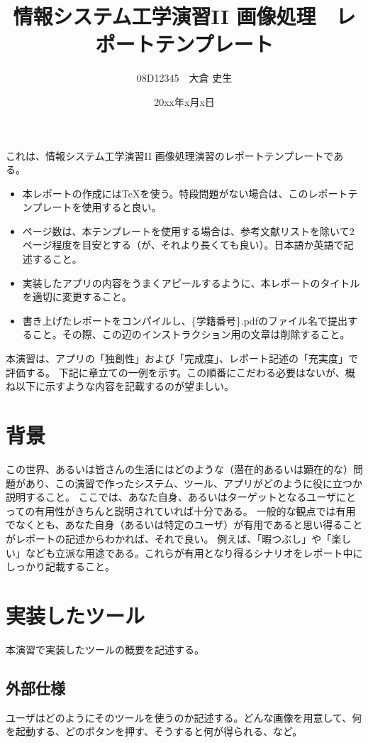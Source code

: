 \documentclass[twocolumn, a4paper]{jsarticle}
\begin{document}
\title{情報システム工学演習II 画像処理　レポートテンプレート}
\author{08D12345　大倉 史生}
\date{20xx年x月x日} 
\twocolumn[
\maketitle
]

これは、情報システム工学演習II 画像処理演習のレポートテンプレートである。
\begin{itemize}
\item 本レポートの作成には\TeX を使う。特段問題がない場合は、このレポートテンプレートを使用すると良い。
\item ページ数は、本テンプレートを使用する場合は、参考文献リストを除いて2ページ程度を目安とする（が、それより長くても良い）。日本語か英語で記述すること。
\item 実装したアプリの内容をうまくアピールするように、本レポートのタイトルを適切に変更すること。
\item 書き上げたレポートをコンパイルし、\{学籍番号\}.pdfのファイル名で提出すること。その際、この辺のインストラクション用の文章は削除すること。
\end{itemize}
本演習は、アプリの「独創性」および「完成度」、レポート記述の「充実度」で評価する。
下記に章立ての一例を示す。この順番にこだわる必要はないが、概ね以下に示すような内容を記載するのが望ましい。

\section{背景}
この世界、あるいは皆さんの生活にはどのような（潜在的あるいは顕在的な）問題があり、この演習で作ったシステム、ツール、アプリがどのように役に立つか説明すること。
ここでは、あなた自身、あるいはターゲットとなるユーザにとっての有用性がきちんと説明されていれば十分である。
一般的な観点では有用でなくとも、あなた自身（あるいは特定のユーザ）が有用であると思い得ることがレポートの記述からわかれば、それで良い。
例えば、「暇つぶし」や「楽しい」なども立派な用途である。これらが有用となり得るシナリオをレポート中にしっかり記載すること。

\section{実装したツール}
本演習で実装したツールの概要を記述する。

\subsection{外部仕様}
ユーザはどのようにそのツールを使うのか記述する。どんな画像を用意して、何を起動する、どのボタンを押す、そうすると何が得られる、など。
\end{document}
